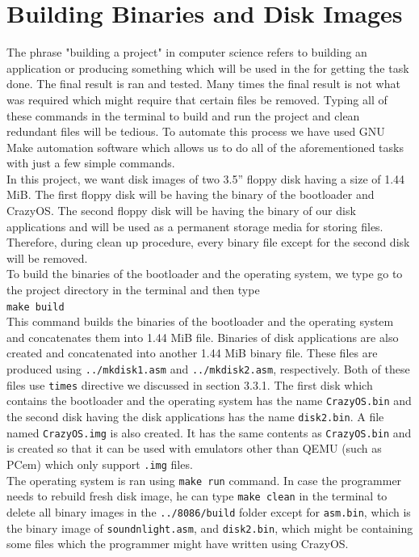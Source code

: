 \section{Building Binaries and Disk Images}
The phrase "building a project" in computer science refers to building an application or producing something which will be used in the for getting the task done. The final result is ran and tested. Many times the final result is not what was required which might require that certain files be removed. Typing all of these commands in the terminal to build and run the project and clean redundant files will be tedious. To automate this process we have used GNU Make automation software which allows us to do all of the aforementioned tasks with just a few simple commands.\\
In this project, we want disk images of two 3.5'' floppy disk having a size of 1.44 MiB. The first floppy disk will be having the binary of the bootloader and CrazyOS. The second floppy disk will be having the binary of our disk applications and will be used as a permanent storage media for storing files. Therefore, during clean up procedure, every binary file except for the second disk will be removed.\\
To build the binaries of the bootloader and the operating system, we type go to the project directory in the terminal and then type\\\texttt{make build}\\
This command builds the binaries of the bootloader and the operating system and concatenates them into 1.44 MiB file. Binaries of disk applications are also created and concatenated into another 1.44 MiB binary file. These files are produced using \texttt{../mkdisk1.asm} and \texttt{../mkdisk2.asm}, respectively. Both of these files use \texttt{times} directive we discussed in section 3.3.1. The first disk which contains the bootloader and the operating system has the name \texttt{CrazyOS.bin} and the second disk having the disk applications has the name \texttt{disk2.bin}. A file named \texttt{CrazyOS.img} is also created. It has the same contents as \texttt{CrazyOS.bin} and is created so that it can be used with emulators other than QEMU (such as PCem) which only support \texttt{.img} files.\\
The operating system is ran using \texttt{make run} command. In case the programmer needs to rebuild fresh disk image, he can type \texttt{make clean} in the terminal to delete all binary images in the \texttt{../8086/build} folder except for \texttt{asm.bin}, which is the binary image of \texttt{soundnlight.asm}, and \texttt{disk2.bin}, which might be containing some files which the programmer might have written using CrazyOS.